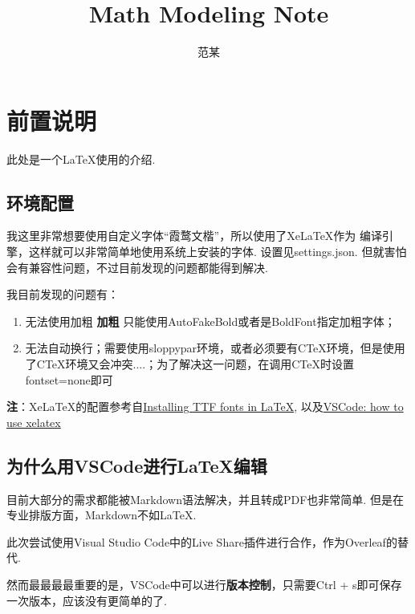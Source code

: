 \documentclass[12pt]{article}
\title{Math Modeling Note}
\author{范某}
\date{}
\begin{document}
\maketitle

\section*{前置说明}

此处是一个LaTeX使用的介绍.

\subsection*{环境配置}

我这里非常想要使用自定义字体“霞鹜文楷”，所以使用了XeLaTeX作为
编译引擎，这样就可以非常简单地使用系统上安装的字体. 设置见settings.json.
但就害怕会有兼容性问题，不过目前发现的问题都能得到解决.

\leavevmode

我目前发现的问题有：
\begin{enumerate}
    \item 无法使用加粗 \textbf{加粗} 只能使用AutoFakeBold或者是BoldFont指定加粗字体；
    \item 无法自动换行；需要使用sloppypar环境，或者必须要有CTeX环境，但是使用了CTeX环境又会冲突....；为了解决这一问题，在调用CTeX时设置fontset=none即可
\end{enumerate}

\noindent \textbf{注}：XeLaTeX的配置参考自\href{https://tex.stackexchange.com/questions/226/installing-ttf-fonts-in-latex}{Installing TTF fonts in LaTeX},
以及\href{https://tex.stackexchange.com/questions/564758/how-to-use-visual-studio-code-latex-workshop-with-xelatex}{VSCode: how to use xelatex}

\leavevmode

\subsection*{为什么用VSCode进行\LaTeX 编辑}

目前大部分的需求都能被Markdown语法解决，并且转成PDF也非常简单. 但是在专业排版方面，Markdown不如\LaTeX.

此次尝试使用Visual Studio Code中的Live Share插件进行合作，作为Overleaf的替代.

然而最最最最重要的是，VSCode中可以进行\textbf{版本控制}，只需要Ctrl + s即可保存一次版本，应该没有更简单的了.

\leavevmode
\end{document}
